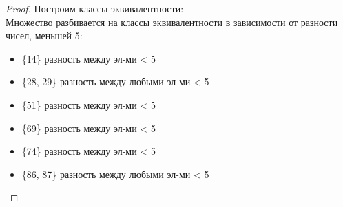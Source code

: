 \begin{proof}
Построим классы эквивалентности: \\
Множество разбивается на классы эквивалентности в зависимости от разности чисел, меньшей 5:

\begin{itemize}
    \item \{14\} разность между эл-ми < 5
    \item \{28, 29\} разность между любыми эл-ми < 5
    \item \{51\} разность между эл-ми < 5
    \item \{69\} разность между эл-ми < 5
    \item \{74\} разность между эл-ми < 5
    \item \{86, 87\} разность между любыми эл-ми < 5
\end{itemize}

\end{proof}